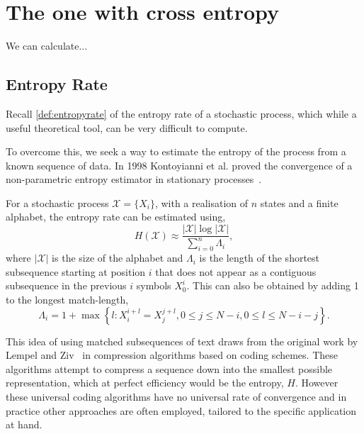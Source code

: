 \chapter{The one with cross entropy \label{ch:crossentropy}}


We can calculate...

\section{Entropy Rate}

Recall \autoref{def:entropyrate} of the entropy rate of a stochastic process, which while a useful theoretical tool, can be very difficult to compute. 

To overcome this, we seek a way to estimate the entropy of the process from a known sequence of data. In 1998 Kontoyianni et al. proved the convergence of a non-parametric entropy estimator in stationary processes~\cite{kontoyiannisNonparametricEntropyEstimation1998}.

\begin{definition}
	For a stochastic process $\mathcal{X} = \{X_i\}$, with a realisation of $n$ states and a finite alphabet,  the entropy rate can be estimated using,
		\begin{equation}\label{eq:estimate}
	H(\mathcal{X}) \approx\frac{|\mathcal{X}| \log |\mathcal{X}| }{\sum_{i=0}^n \Lambda_{i} },
	\end{equation}
	where $|\mathcal{X}|$ is the size of the alphabet and $\Lambda_{i}$ is the length of the shortest subsequence starting at position $i$ that does not appear as a contiguous subsequence in the previous $i$ symbols $X_{0}^{i}$. This can also be obtained by adding 1 to the longest match-length, 
	 \begin{equation}\label{eq:lambda}
	  \Lambda_{i}=1+\max \left\{l: X_{i}^{i+l}=X_{j}^{j+l}, 0 \leq j \leq N-i, 0 \leq l \leq N - i - j \right\}.
	 \end{equation}
\end{definition}


This idea of using matched subsequences of text draws from the original work by Lempel and Ziv~\cite{zivUniversalAlgorithmSequential1977} in compression algorithms based on coding schemes. These algorithms attempt to compress a sequence down into the smallest possible representation, which at perfect efficiency would be the entropy, $H$. However these universal coding algorithms have no universal rate of convergence \cite{shieldsUniversalRedundancyRates1993, shieldsUniversalRedundancyRates1995} and in practice other approaches are often employed, tailored to the specific application at hand.

